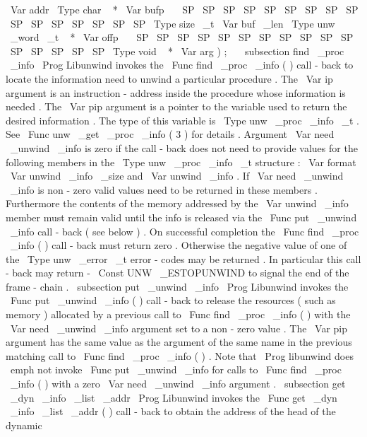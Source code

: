 \
Var
{
addr
}
\
Type
{
char
~
*
}
\
Var
{
bufp
}
\
\
\
SP
\
SP
\
SP
\
SP
\
SP
\
SP
\
SP
\
SP
\
SP
\
SP
\
SP
\
SP
\
SP
\
SP
\
SP
\
SP
\
Type
{
size
\
_t
}
\
Var
{
buf
\
_len
}
\
Type
{
unw
\
_word
\
_t
~
*
}
\
Var
{
offp
}
\
\
\
SP
\
SP
\
SP
\
SP
\
SP
\
SP
\
SP
\
SP
\
SP
\
SP
\
SP
\
SP
\
SP
\
SP
\
SP
\
SP
\
Type
{
void
~
*
}
\
Var
{
arg
}
)
;
\
\
\
subsection
{
find
\
_proc
\
_info
}
\
Prog
{
Libunwind
}
invokes
the
\
Func
{
find
\
_proc
\
_info
}
(
)
call
-
back
to
locate
the
information
need
to
unwind
a
particular
procedure
.
The
\
Var
{
ip
}
argument
is
an
instruction
-
address
inside
the
procedure
whose
information
is
needed
.
The
\
Var
{
pip
}
argument
is
a
pointer
to
the
variable
used
to
return
the
desired
information
.
The
type
of
this
variable
is
\
Type
{
unw
\
_proc
\
_info
\
_t
}
.
See
\
Func
{
unw
\
_get
\
_proc
\
_info
(
3
)
}
for
details
.
Argument
\
Var
{
need
\
_unwind
\
_info
}
is
zero
if
the
call
-
back
does
not
need
to
provide
values
for
the
following
members
in
the
\
Type
{
unw
\
_proc
\
_info
\
_t
}
structure
:
\
Var
{
format
}
\
Var
{
unwind
\
_info
\
_size
}
and
\
Var
{
unwind
\
_info
}
.
If
\
Var
{
need
\
_unwind
\
_info
}
is
non
-
zero
valid
values
need
to
be
returned
in
these
members
.
Furthermore
the
contents
of
the
memory
addressed
by
the
\
Var
{
unwind
\
_info
}
member
must
remain
valid
until
the
info
is
released
via
the
\
Func
{
put
\
_unwind
\
_info
}
call
-
back
(
see
below
)
.
On
successful
completion
the
\
Func
{
find
\
_proc
\
_info
}
(
)
call
-
back
must
return
zero
.
Otherwise
the
negative
value
of
one
of
the
\
Type
{
unw
\
_error
\
_t
}
error
-
codes
may
be
returned
.
In
particular
this
call
-
back
may
return
-
\
Const
{
UNW
\
_ESTOPUNWIND
}
to
signal
the
end
of
the
frame
-
chain
.
\
subsection
{
put
\
_unwind
\
_info
}
\
Prog
{
Libunwind
}
invokes
the
\
Func
{
put
\
_unwind
\
_info
}
(
)
call
-
back
to
release
the
resources
(
such
as
memory
)
allocated
by
a
previous
call
to
\
Func
{
find
\
_proc
\
_info
}
(
)
with
the
\
Var
{
need
\
_unwind
\
_info
}
argument
set
to
a
non
-
zero
value
.
The
\
Var
{
pip
}
argument
has
the
same
value
as
the
argument
of
the
same
name
in
the
previous
matching
call
to
\
Func
{
find
\
_proc
\
_info
}
(
)
.
Note
that
\
Prog
{
libunwind
}
does
\
emph
{
not
}
invoke
\
Func
{
put
\
_unwind
\
_info
}
for
calls
to
\
Func
{
find
\
_proc
\
_info
}
(
)
with
a
zero
\
Var
{
need
\
_unwind
\
_info
}
argument
.
\
subsection
{
get
\
_dyn
\
_info
\
_list
\
_addr
}
\
Prog
{
Libunwind
}
invokes
the
\
Func
{
get
\
_dyn
\
_info
\
_list
\
_addr
}
(
)
call
-
back
to
obtain
the
address
of
the
head
of
the
dynamic

